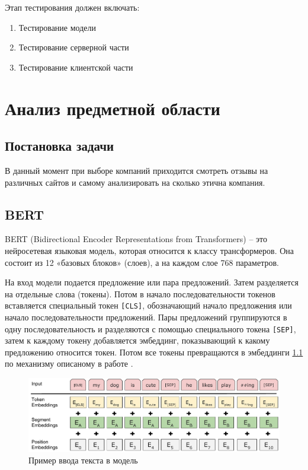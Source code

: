 \documentclass[PI, VKR]{HSEUniversity}
\begin{document}
Этап тестирования должен включать:
\begin{enumerate}
\item Тестирование модели
\item Тестирование серверной части
\item Тестирование клиентской части
\end{enumerate}
\chapter{Анализ предметной области}
\label{sec:orgabd4fa9}
\section{Постановка задачи}
\label{sec:orga7787f5}
В данный момент при выборе компаний приходится смотреть отзывы на различных сайтов и самому анализировать на сколько этична компания.
\section{BERT}
\label{sec:orgb326b46}
BERT \autocite{devlin2018bert} (Bidirectional Encoder Representations from Transformers) -- это нейросетевая языковая модель, которая относится к классу трансформеров. Она состоит из 12 «базовых блоков» (слоев), а на каждом слое 768 параметров.

На вход модели подается предложение или пара предложений. Затем разделяется на отдельные слова (токены). Потом в начало последовательности токенов вставляется специальный токен \texttt{[CLS]}, обозначающий начало предложения или начало последовательности предложений. Пары предложений группируются в одну последовательность и разделяются с помощью специального токена \texttt{[SEP]}, затем к каждому токену добавляется эмбеддинг, показывающий к какому предложению относится токен. Потом все токены превращаются в эмбеддинги \ref{fig:inputemebeddings} по механизму описаному в работе \autocite{NIPS2017_3f5ee243}.

\begin{figure}[h]
\centering
\includegraphics[width=.9\linewidth]{img/Input_Emebeddings.pdf}
\caption{\label{fig:inputemebeddings}Пример ввода текста в модель}
\end{figure}
\end{document}

